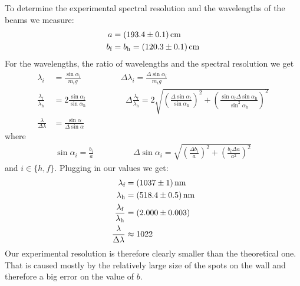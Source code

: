 \documentclass{protokoll_en}
\begin{document}
To determine the experimental spectral resolution and the wavelengths of the beams we measure:
\begin{align}
a &= \unit[(193.4 \pm 0.1)]{cm}\\
\notag b_\textrm{f} &= b_\textrm{h} = \unit[(120.3 \pm 0.1)]{cm}%
\end{align}
For the wavelengths, the ratio of wavelengths and the spectral resolution we get
\begin{align*}
\lambda_i &= \frac{\sin\alpha_i}{m_ig}\hspace{2cm}\Delta \lambda_i = \frac{\Delta\sin\alpha_i}{m_ig}\\
\frac{\lambda_\textrm{f}}{\lambda_\textrm{h}} &= 2 \frac{\sin\alpha_\textrm{f}}{\sin\alpha_\textrm{h}}\hspace{2cm} \Delta\frac{\lambda_\textrm{f}}{\lambda_\textrm{h}} = 2\sqrt{\left(\frac{\Delta\sin\alpha_\textrm{f}}{\sin\alpha_\textrm{h}}\right)^2+\left(\frac{\sin\alpha_\textrm{f}\Delta\sin\alpha_\textrm{h}}{\sin^2\alpha_\textrm{h}}\right)^2}\\
\frac{\lambda}{\Delta \lambda}&=\frac{\sin\alpha}{\Delta\sin\alpha}
\end{align*}
where
\begin{align*}
\sin\alpha_i = \frac{b_i}{a}\hspace{2cm}\Delta \sin\alpha_i=\sqrt{\left(\frac{\Delta b_i}{a}\right)^2+\left(\frac{b_i\Delta a}{a^2}\right)^2}
\end{align*}
and $i \in \{h,f\}$. Plugging in our values we get:
\begin{align}
\lambda_\textrm{f}&=\unit[(1037 \pm 1)]{nm} \\
 \lambda_\textrm{h}&=\unit[(518.4 \pm 0.5)]{nm}\\
\frac{\lambda_\textrm{f}}{\lambda_\textrm{h}} &= \unit[(2.000 \pm 0.003)]{}\\
\frac{\lambda}{\Delta \lambda} &\approx \unit[1022]{}
\end{align}
Our experimental resolution is therefore clearly smaller than the theoretical one. That is caused mostly by the relatively large size of the spots on the wall and therefore a big error on the value of $b$.
\end{document}
